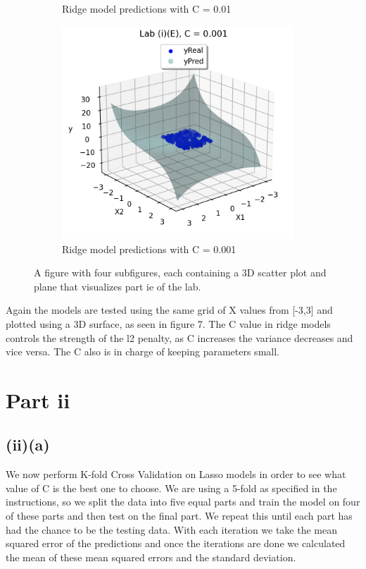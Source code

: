 \documentclass{article}
\begin{document}
\begin{figure}
\begin{subfigure}{.5\linewidth}
  \caption{Ridge model predictions with C = 0.01}
  \label{fig:sub3}
\end{subfigure}%
\begin{subfigure}{.5\textwidth}
  \centering
  \includegraphics[width=\linewidth, height=8cm]{ie4.png}
  \caption{Ridge model predictions with C = 0.001}
  \label{fig:sub4}
\end{subfigure}
\caption{A figure with four subfigures, each containing a 3D scatter plot and plane that visualizes part ie of the lab.}
\label{fig:test}
\end{figure}

Again the models are tested using the same grid of X values from [-3,3] and plotted using a 3D surface, as seen in figure 7. The C value in ridge models controls the strength of the l2 penalty, as C increases the variance decreases and vice versa. The C also is in charge of keeping parameters small.

\section{Part ii}
\subsection{(ii)(a)}
We now perform K-fold Cross Validation on Lasso models in order to see what value of C is the best one to choose. We are using a 5-fold as specified in the instructions, so we split the data into five equal parts and train the model on four of these parts and then test on the final part. We repeat this until each part has had the chance to be the testing data. With each iteration we take the mean squared error of the predictions and once the iterations are done we calculated the mean of these mean squared errors and the standard deviation.
\end{document}
